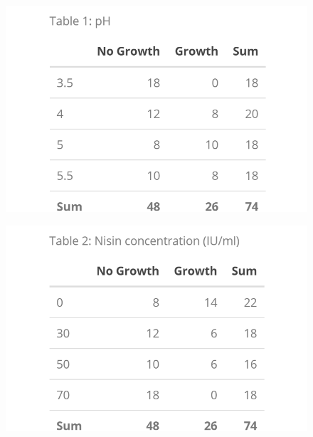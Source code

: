 \documentclass[
  12pt,
]{article}
\begin{document}
\begin{figure}
\centering
\begin{minipage}{.5\textwidth}
  \centering
  \caption*{}
  \includegraphics[width=\linewidth]{ph}
  \label{table1:ph}
\end{minipage}%
\begin{minipage}{.5\textwidth}
  \centering
  \caption*{}
  \includegraphics[width=\linewidth]{nisin}
  \label{table2:nisin}
\end{minipage}
\end{figure}
\end{document}

